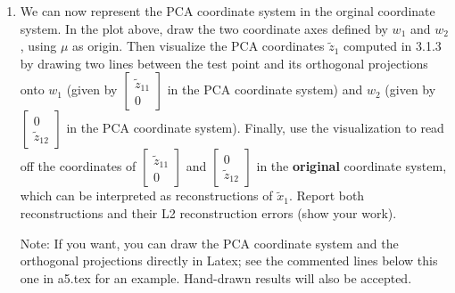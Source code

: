 \documentclass{article}
\def\blu#1{{\color{blu}#1}}
\begin{document}
\begin{enumerate}
  \item We can now represent the PCA coordinate system in the orginal coordinate system. \blu{In the plot above, draw the two coordinate axes defined by $w_1$ and $w_2$, using $\mu$ as origin. Then visualize the PCA coordinates $\tilde{z}_1$ computed in 3.1.3 by drawing two lines between the test point and its orthogonal projections onto $w_1$ (given by $\begin{bmatrix} \tilde{z}_{11} \\ 0 \end{bmatrix}$ in the PCA coordinate system) and $w_2$ (given by $\begin{bmatrix} 0 \\ \tilde{z}_{12} \end{bmatrix}$ in the PCA coordinate system). Finally, use the visualization to read off the coordinates of $\begin{bmatrix} \tilde{z}_{11} \\ 0 \end{bmatrix}$ and $\begin{bmatrix} 0 \\ \tilde{z}_{12} \end{bmatrix}$ in the {\bf original} coordinate system, which can be interpreted as reconstructions of $\tilde{x}_1$. Report both reconstructions and their L2 reconstruction errors (show your work).}
  
   Note: If you want, you can draw the PCA coordinate system and the orthogonal projections directly in Latex; see the commented lines below this one in a5.tex for an example. Hand-drawn results will also be accepted.
   

\end{enumerate}
\end{document}
